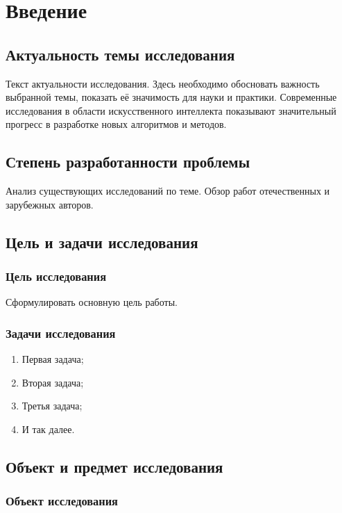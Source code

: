 \chapter{Введение}

\section{Актуальность темы исследования}

Текст актуальности исследования. Здесь необходимо обосновать важность выбранной темы, показать её значимость для науки и практики. Современные исследования в области искусственного интеллекта \cite{ai_survey} показывают значительный прогресс в разработке новых алгоритмов и методов.

\section{Степень разработанности проблемы}

Анализ существующих исследований по теме. Обзор работ отечественных и зарубежных авторов.

\section{Цель и задачи исследования}

\subsection{Цель исследования}

Сформулировать основную цель работы.

\subsection{Задачи исследования}

\begin{enumerate}
    \item Первая задача;
    \item Вторая задача;
    \item Третья задача;
    \item И так далее.
\end{enumerate}

\section{Объект и предмет исследования}

\subsection{Объект исследования}


